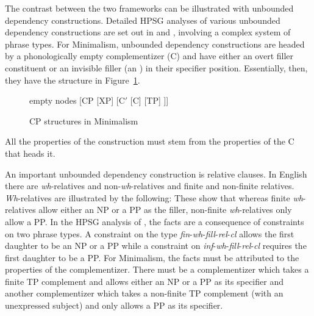 \documentclass[output=paper]{langsci/langscibook}
\begin{document}
The contrast between the two frameworks can be illustrated with unbounded dependency
constructions. Detailed HPSG analyses of various unbounded dependency constructions are set out in
\citet{Sag97a,Sag2010b} and \citet{GSag2000a-u}, involving a complex system of phrase types. For
Minimalism, unbounded dependency constructions are headed by a phonologically empty complementizer
(C) and have either an overt filler constituent or an invisible filler (an ) in their
specifier position. Essentially, then, they have the structure in Figure~\ref{fig:min-CP}.
\begin{figure}
	\centering
	\begin{forest} %
		empty nodes
		[CP
		[XP]
		[C$'$ [C] [TP]
		]]
	\end{forest}
	\caption{\label{fig:min-CP}CP structures in Minimalism}
\end{figure}
All the properties of the construction must stem from the properties of the C that heads it. 

An important unbounded dependency construction is relative clauses. In English there are \textit{wh}-relatives and non-\textit{wh}-relatives and finite and non-finite relatives. \textit{Wh}-relatives are illustrated by the following:
\eal
{}\label{ex:min-someone-who-can}
\label{ex:min-someone-on-whom-can}
\zl 
\eal
{}\label{ex:min-someone-who-to}
\label{ex:min-someone-whom-to}
\zl 
These show that whereas finite \textit{wh}-relatives allow either an NP or a PP as the filler,
non-finite \textit{wh}-relatives only allow a PP. In the HPSG analysis of \citet{Sag97a}, the facts
are a consequence of constraints on two phrase types. A constraint on the type
\textit{fin}-\textit{wh}-\textit{fill}-\textit{rel}-\textit{cl} allows the first daughter to be an
NP or a PP while a constraint on \textit{inf}-\textit{wh}-\textit{fill}-\textit{rel}-\textit{cl}
requires the first daughter to be a PP. For Minimalism, the facts must be attributed to the
properties of the complementizer. There must be a complementizer which takes a finite TP complement
and allows either an NP or a PP as its specifier and another complementizer which takes a non-finite
TP complement (with an unexpressed subject) and only allows a PP as its specifier. 
\end{document}

